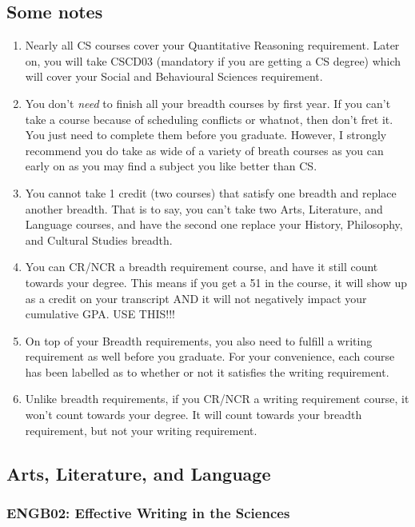 \documentclass[11pt]{article}
\begin{document}
\subsection{Some notes}
\begin{enumerate}
\item Nearly all CS courses cover your Quantitative Reasoning requirement. Later on, you will take CSCD03 (mandatory if you are getting a CS degree) which will cover your Social and Behavioural Sciences requirement.

\item You don't \textit{need} to finish all your breadth courses by first year. If you can't take a course because of scheduling conflicts or whatnot, then don't fret it. You just need to complete them before you graduate. However, I strongly recommend you do take as wide of a variety of breath courses as you can early on as you may find a subject you like better than CS.

\item You cannot take 1 credit (two courses) that satisfy one breadth and replace another breadth.  That is to say, you can't take two Arts, Literature, and Language courses, and have the second one replace your History, Philosophy, and Cultural Studies breadth.

\item You can CR/NCR a breadth requirement course, and have it still count towards your degree. This means if you get a 51 in the course, it will show up as a credit on your transcript AND it will not negatively impact your cumulative GPA. USE THIS!!!

\item On top of your Breadth requirements, you also need to fulfill a writing requirement as well before you graduate.  For your convenience, each course has been labelled as to whether or not it satisfies the writing requirement.

\item Unlike breadth requirements, if you CR/NCR a writing requirement course, it won't count towards your degree.  It will count towards your breadth requirement, but not your writing requirement.
\end{enumerate}

\subsection{Arts, Literature, and Language}
\subsubsection{ENGB02: Effective Writing in the Sciences}
\end{document}
